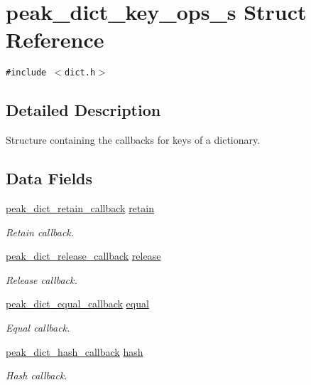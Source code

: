 \hypertarget{structpeak__dict__key__ops__s}{
\section{peak\_\-dict\_\-key\_\-ops\_\-s Struct Reference}
\label{structpeak__dict__key__ops__s}
}
{\tt \#include $<$dict.h$>$}



\subsection{Detailed Description}
Structure containing the callbacks for keys of a dictionary. 

\subsection*{Data Fields}
\begin{CompactItemize}
\item 
\hyperlink{group__dict_ga1}{peak\_\-dict\_\-retain\_\-callback} \hyperlink{structpeak__dict__key__ops__s_o0}{retain}
\begin{CompactList}\small\item\em Retain callback. \item\end{CompactList}\item 
\hyperlink{group__dict_ga2}{peak\_\-dict\_\-release\_\-callback} \hyperlink{structpeak__dict__key__ops__s_o1}{release}
\begin{CompactList}\small\item\em Release callback. \item\end{CompactList}\item 
\hyperlink{group__dict_ga3}{peak\_\-dict\_\-equal\_\-callback} \hyperlink{structpeak__dict__key__ops__s_o2}{equal}
\begin{CompactList}\small\item\em Equal callback. \item\end{CompactList}\item 
\hyperlink{group__dict_ga4}{peak\_\-dict\_\-hash\_\-callback} \hyperlink{structpeak__dict__key__ops__s_o3}{hash}
\begin{CompactList}\small\item\em Hash callback. \item\end{CompactList}\end{CompactItemize}


